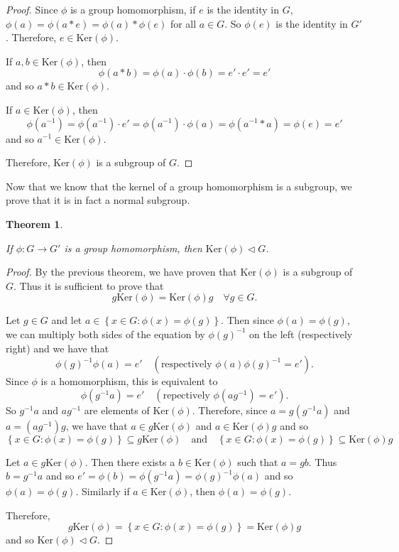 \documentclass[
]{book}
\newtheorem{theorem}{Theorem}[chapter]
\theoremstyle{definition}
\theoremstyle{definition}
\theoremstyle{definition}
\theoremstyle{definition}
\theoremstyle{remark}
\begin{document}
\begin{proof}

Since \(\phi\) is a group homomorphism, if \(e\) is the identity in \(G\), \(\phi(a)=\phi(a*e)=\phi(a)*\phi(e)\) for all \(a\in G\). So \(\phi(e)\) is the identity in \(G'\). Therefore, \(e \in \mbox{Ker}(\phi)\).

If \(a,b \in \mbox{Ker}(\phi)\), then \[ \phi(a*b)=\phi(a) \cdot \phi(b) = e' \cdot e' = e' \] and so \(a*b \in \mbox{Ker}(\phi)\).

If \(a\in \mbox{Ker}(\phi)\), then \[\phi(a^{-1}) = \phi(a^{-1})\cdot e' = \phi(a^{-1})\cdot \phi(a) = \phi(a^{-1}*a) = \phi(e)=e'\] and so \(a^{-1}\in \mbox{Ker}(\phi)\).

Therefore, \(\mbox{Ker}(\phi)\) is a subgroup of \(G\).

\end{proof}

Now that we know that the kernel of a group homomorphism is a subgroup, we prove that it is in fact a normal subgroup.

\begin{theorem}
\protect\hypertarget{thm:unlabeled-div-228}{}\label{thm:unlabeled-div-228}

If \(\phi:G \rightarrow G'\) is a group homomorphism, then \(\mbox{Ker}(\phi) \vartriangleleft G\).

\end{theorem}

\begin{proof}

By the previous theorem, we have proven that \(\mbox{Ker}(\phi)\) is a subgroup of \(G\). Thus it is sufficient to prove that \[g \mbox{Ker}(\phi)= \mbox{Ker}(\phi) g \quad \forall g\in G.\]

Let \(g\in G\) and let \(a \in \left\{ x \in G : \phi(x)= \phi(g) \right\}\). Then since \(\phi(a)=\phi(g)\), we can multiply both sides of the equation by \(\phi(g)^{-1}\) on the left (respectively right) and we have that
\[\phi(g)^{-1} \phi(a) = e' \quad \left(\mbox{respectively }  \phi(a) \phi(g)^{-1} =e' \right).\]
Since \(\phi\) is a homomorphism, this is equivalent to
\[\phi(g^{-1} a) =e' \quad \left( \mbox{repectively }  \phi( a g^{-1}) =e' \right) .\]
So \(g^{-1}a\) and \(a g^{-1}\) are elements of \(\mbox{Ker}(\phi)\). Therefore, since \(a= g (g^{-1}a)\) and \(a= (a g^{-1})g\), we have that \(a \in g \mbox{Ker}(\phi)\) and \(a \in \mbox{Ker}(\phi) g\) and so
\[\left\{ x \in G : \phi(x)= \phi(g)  \right\} \subseteq g \mbox{Ker}(\phi) \quad \mbox{and} \quad \left\{ x \in G : \phi(x)= \phi(g)  \right\} \subseteq \mbox{Ker}(\phi) g\]

Let \(a \in g \mbox{Ker}(\phi)\). Then there exists a \(b\in \mbox{Ker}(\phi)\) such that \(a=gb\). Thus \(b=g^{-1}a\) and so \(e'=\phi(b) = \phi(g^{-1} a) = \phi(g)^{-1} \phi(a)\) and so \(\phi(a)=\phi(g)\). Similarly if \(a \in \mbox{Ker}(\phi)\), then \(\phi(a)=\phi(g)\).

Therefore, \[g \mbox{Ker}(\phi) =   \left\{ x \in G : \phi(x)= \phi(g)  \right\} = \mbox{Ker}(\phi) g\] and so \(\mbox{Ker}(\phi) \vartriangleleft G\).

\end{proof}
\end{document}
